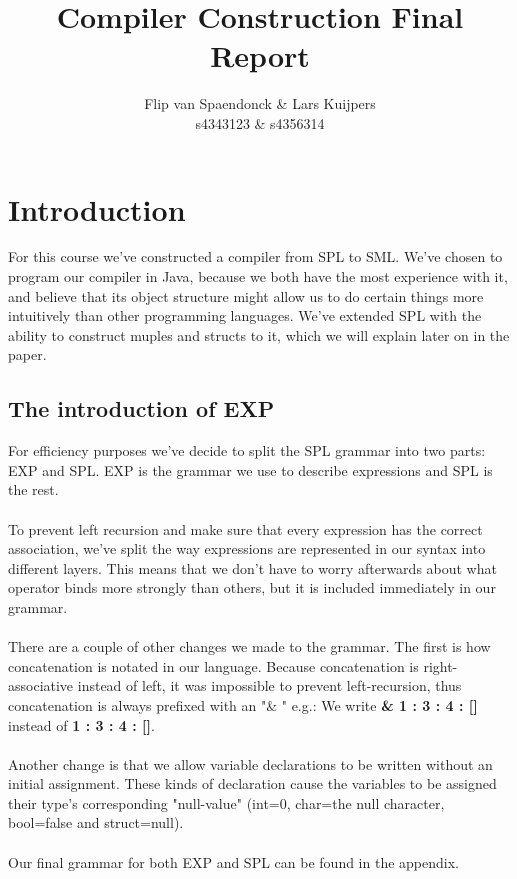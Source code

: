 \documentclass[10pt,a4paper]{article}
\author{Flip van Spaendonck \& Lars Kuijpers \\ s4343123 \& s4356314}
\title{Compiler Construction Final Report}
\begin{document}
\maketitle
\tableofcontents

\section{Introduction}
For this course we've constructed a compiler from SPL to SML. We've chosen to program our compiler in Java, because we both have the most experience with it, and believe that its object structure might allow us to do certain things more intuitively than other programming languages. We've extended SPL with the ability to construct muples and structs to it, which we will explain later on in the paper.

\subsection{The introduction of EXP}
For efficiency purposes we've decide to split the SPL grammar into two parts: EXP and SPL. EXP is the grammar we use to describe expressions and SPL is the rest. \\
\\
To prevent left recursion and make sure that every expression has the correct association, we've split the way expressions are represented in our syntax into different layers. This means that we don't have to worry afterwards about what operator binds more strongly than others, but it is included immediately in our grammar.\\
\\
There are a couple of other changes we made to the grammar. The first is how concatenation is notated in our language. Because concatenation is right-associative instead of left, it was impossible to prevent left-recursion, thus concatenation is always prefixed with an "\& " e.g.: We write \textbf{\& 1 : 3 : 4 : []} instead of \textbf{1 : 3 : 4 : []}.\\
\\
Another change is that we allow variable declarations to be written without an initial assignment. These kinds of declaration cause the variables to be assigned their type's corresponding "null-value" (int=0, char=the null character, bool=false and struct=null).\\
\\
Our final grammar for both EXP and SPL can be found in the appendix.
\end{document}
